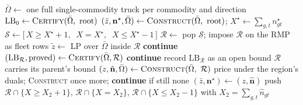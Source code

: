 \begin{algorithm}[!h]
\caption{The fleet tree for 3D-SCPTOP: branch and bound over the fleet
vector with the flow-first construction as primal}\label{alg:bp3d}
\begin{algorithmic}[1]
\State $\bar\Omega \gets$ one full single-commodity truck per commodity and direction
\State $\mathrm{LB}_{0} \gets \textsc{Certify}(\bar\Omega,\ \text{root})$
\State $(\bar z,\mathbf{n}^{\star},\bar\Omega) \gets \textsc{Construct}(\bar\Omega,\ \text{root})$;
       \quad $X^{\star}\gets\sum_{g,t}n^{\star}_{gt}$
\State $\mathcal{S} \gets \bigl[\,X\ge X^{\star}+1,\;\; X=X^{\star},\;\; X\le X^{\star}-1\,\bigr]$
   \State $\mathcal{R} \gets$ pop $\mathcal{S}$; impose $\mathcal{R}$ on the RMP as fleet rows
   \State $\tilde z \gets$ LP over $\bar\Omega$ inside $\mathcal{R}$
    \State \textbf{continue}  \EndIf
      \State $(\mathrm{LB}_{\mathcal{R}},\text{proved}) \gets \textsc{Certify}(\bar\Omega,\mathcal{R})$
         \State \textbf{continue} 
      \EndIf
      \State record $\mathrm{LB}_{\mathcal{R}}$ as an open bound
   \Else
      \State $\mathcal{R}$ carries its parent's bound
   \EndIf
   \State $(z,\hat{\mathbf{n}},\bar\Omega) \gets \textsc{Construct}(\bar\Omega,\ \mathcal{R})$
    \State price under the region's duals; \textsc{Construct} once more; \textbf{continue} if still none \EndIf
    \State $(\bar z,\mathbf{n}^{\star}) \gets (z,\hat{\mathbf{n}})$
           \EndIf
    \State push $\mathcal{R}\cap\{X\ge X_{2}+1\}$, $\mathcal{R}\cap\{X=X_{2}\}$, $\mathcal{R}\cap\{X\le X_{2}-1\}$ with $X_{2}=\sum_{g,t}\hat n_{gt}$
           \EndIf

\end{algorithmic}
\end{algorithm}

